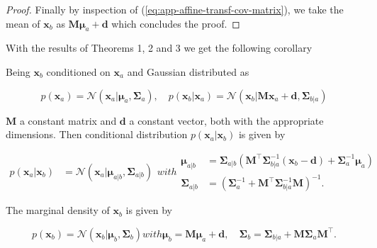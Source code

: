 \begin{appendices}
\begin{proof}
    Finally by inspection of (\ref{eq:app-affine-transf-cov-matrix}), we take the mean of $\mathbf{x}_b$ as $\mathbf{M} \boldsymbol{\mu}_{a}+\mathbf{d}$ which concludes the proof.
  \end{proof}

  With the results of Theorems 1, 2 and 3 we get the following corollary

  \begin{corollary}
    \label{cor:aff-marg-cond-gaussian}

    Being $\mathbf{x}_b$ conditioned on $\mathbf{x}_a$ and Gaussian distributed as

    \begin{equation}
      p\left(\mathbf{x}_{a}\right)=\mathcal{N}\left(\mathbf{x}_{a} | \boldsymbol{\mu}_{a}, \boldsymbol{\Sigma}_{a}\right), \quad p\left(\mathbf{x}_{b} | \mathbf{x}_{a}\right)=\mathcal{N}\left(\mathbf{x}_{b} | \mathbf{M} \mathbf{x}_{a}+\mathbf{d}, \boldsymbol{\Sigma}_{b | a}\right)
    \end{equation}

     $\mathbf{M}$ a constant matrix and $\mathbf{d}$ a constant vector, both with the appropriate dimensions. Then conditional distribution $p(\mathbf{x}_a|\mathbf{x}_b)$ is given by

    \begin{subequations}
    
    \begin{align}
      p\left(\mathbf{x}_{a} | \mathbf{x}_{b}\right)&=\mathcal{N}\left(\mathbf{x}_{a} | \boldsymbol{\mu}_{a | b}, \boldsymbol{\Sigma}_{a | b}\right)
    \end{align}
    with
    \begin{align}
        \boldsymbol{\mu}_{a | b}&=\boldsymbol{\Sigma}_{a | b}\left(\mathbf{M}^\top \boldsymbol{\Sigma}_{b | a}^{-1}\left(\mathbf{x}_{b}-\mathbf{d}\right)+\boldsymbol{\Sigma}_{a}^{-1} \boldsymbol{\mu}_{a}\right) \\ \boldsymbol{\Sigma}_{a | b}&=\left(\boldsymbol{\Sigma}_{a}^{-1}+\mathbf{M}^\top \boldsymbol{\Sigma}_{b | a}^{-1} \mathbf{M}\right)^{-1}.
    \end{align}
  \end{subequations}
  
  The marginal density of $\mathbf{x}_b$ is given by

  
  \begin{subequations}
    \begin{equation}
      p\left(\mathbf{x}_{b}\right)=\mathcal{N}\left(\mathbf{x}_{b} | \boldsymbol{\mu}_{b}, \boldsymbol{\Sigma}_{b}\right)
    \end{equation}
    with
    \begin{equation}
    \label{eq:app-cor-affine-b}
     \boldsymbol{\mu}_{b} =\mathbf{M} \boldsymbol{\mu}_{a}+\mathbf{d} , \quad \boldsymbol{\Sigma}_{b} =\boldsymbol{\Sigma}_{b | a}+\mathbf{M} \boldsymbol{\Sigma}_{a} \mathbf{M}^\top .
    \end{equation}
  \end{subequations}
  \end{corollary}

\end{appendices}